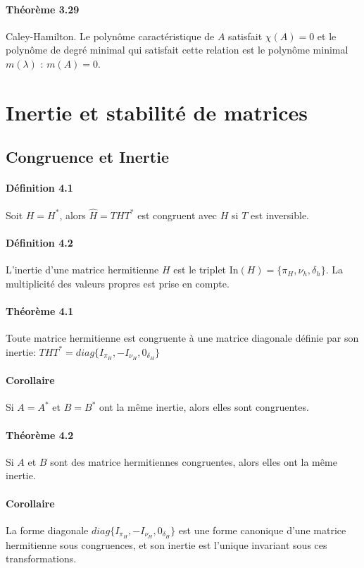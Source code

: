 \paragraph{Théorème 3.29} Caley-Hamilton. Le polynôme caractéristique de $A$ satisfait $\chi(A) = 0$ et le polynôme de degré minimal qui satisfait cette relation est le polynôme minimal $m(\lambda)$ : $m(A) =0$.

\section{Inertie et stabilité de matrices}

\subsection{Congruence et Inertie}

\paragraph{Définition 4.1} Soit $H=H^*$, alors  $\hat{H} = THT^*$ est congruent avec $H$ si $T$ est inversible.

\paragraph{Définition 4.2} L'inertie d'une matrice hermitienne $H$ est le triplet In$(H) =\{\pi_H, \nu_h, \delta_h\}$. La multiplicité des valeurs propres est prise en compte.

\paragraph{Théorème 4.1} Toute matrice hermitienne est congruente à une matrice diagonale définie par son inertie: $THT^* = diag\{I_{\pi_H},-I_{\nu_H}, 0_{\delta_H}\}$

\paragraph{Corollaire} Si $A=A^*$ et $B=B^*$ ont la même inertie, alors elles sont congruentes.

\paragraph{Théorème 4.2} Si $A$ et $B$ sont des matrice hermitiennes congruentes, alors elles ont la même inertie.

\paragraph{Corollaire} La forme diagonale $diag\{I_{\pi_H},-I_{\nu_H}, 0_{\delta_H}\}$ est une forme canonique d'une matrice hermitienne sous congruences, et son inertie est l'unique invariant sous ces transformations.


